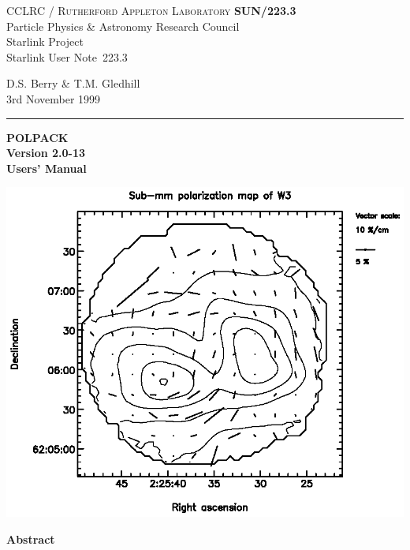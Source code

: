 \documentclass[twoside,11pt]{article}
\newcommand{\stardoccategory}  {Starlink User Note}
\newcommand{\stardocinitials}  {SUN}
\newcommand{\stardocnumber}    {223.3}
\newcommand{\stardocauthors}   {D.S. Berry \& T.M. Gledhill }
\newcommand{\stardocdate}      {3rd November 1999}
\newcommand{\stardoctitle}     {POLPACK}
\newcommand{\stardocversion}   {Version 2.0-13}
\newcommand{\stardocmanual}    {Users' Manual}
\newcommand{\stardocname}{\stardocinitials /\stardocnumber}
\newenvironment{latexonly}{}{}
\renewcommand{\_}{\texttt{\symbol{95}}}
\begin{document}
\thispagestyle{empty}

\begin{latexonly}
   CCLRC / \textsc{Rutherford Appleton Laboratory} \hfill \textbf{\stardocname}\\
   {\large Particle Physics \& Astronomy Research Council}\\
   {\large Starlink Project\\}
   {\large \stardoccategory\ \stardocnumber}
   \begin{flushright}
   \stardocauthors\\
   \stardocdate
   \end{flushright}
   \vspace{-4mm}
   \rule{\textwidth}{0.5mm}
   \vspace{5mm}
   \begin{center}
   {\Huge\textbf{\stardoctitle \\ [2.5ex]}}
   {\LARGE\textbf{\stardocversion \\ [4ex]}}
   {\Huge\textbf{\stardocmanual}}
   \end{center}
   \vspace{5mm}

   \begin{center}
   \includegraphics[clip,scale=1.0]{sun223_figures/fig.eps}
   \end{center}

   \vspace{5mm}
   \begin{center}
      {\Large\textbf{Abstract}}
   \end{center}
\end{latexonly}
\end{document}
